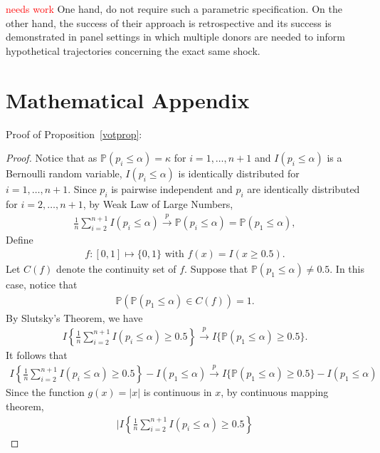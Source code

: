 \documentclass[11pt]{article}
\def\P{\mathbb{P}}
\theoremstyle{definition}
\begin{document}
\textcolor{red}{needs work} One hand, \cite{agarwal2020two} do not require such a parametric specification. On the other hand, the success of their approach is retrospective and its success is demonstrated in panel settings in which multiple donors are needed to inform hypothetical trajectories concerning the exact same shock.





\section{Mathematical Appendix}


Proof of Proposition~\ref{votprop}:

\begin{proof}
Notice that as $\P(p_i \leq \alpha)=\kappa$ for $i = 1, \ldots, n+1$ and $I(p_i \leq  \alpha) $ is a Bernoulli random variable, $I(p_i \leq  \alpha)$ is identically distributed for  $i = 1, \ldots, n+1$. Since $p_i$ is pairwise independent and $p_i$ are identically distributed for $i = 2, \ldots, n+1$, by Weak Law of Large Numbers, 
\begin{align*}
  \frac{1}{n}\sum_{i=2}^{n+1}I(p_i \leq  \alpha)  
   \stackrel{p}{\rightarrow}  \P(p_i \leq \alpha) = \P(p_1 \leq \alpha),
\end{align*}
Define
\begin{align*}
  f \colon [0,1] \mapsto \{0,1\} 
  \text{ with }
  f(x) = I(x \geq 0.5).
\end{align*}
Let $C(f)$ denote the continuity set of $f$. Suppose that $\P(p_1 \leq  \alpha) \neq 0.5$. In this case, notice that 
\begin{align*}
  \P(\P(p_1 \leq  \alpha) \in C(f)) =1.
\end{align*}
By Slutsky's Theorem, we have
\begin{align*}
  I\left\{\frac{1}{n}\sum_{i=2}^{n+1}I(p_i \leq  \alpha) \geq 0.5\right\}
  \stackrel{p}{\rightarrow} 
  I\{ \P(p_1 \leq  \alpha) \geq 0.5\}.
\end{align*}
It follows that
\begin{align*}
   I\left\{\frac{1}{n}\sum_{i=2}^{n+1}I(p_i \leq  \alpha) \geq 0.5\right\}- I( p_1 \leq  \alpha) 
  \stackrel{p}{\rightarrow} 
  I\{ \P(p_1 \leq  \alpha) \geq 0.5\} - I( p_1 \leq  \alpha) 
\end{align*}
Since the function $g(x)= |x|$ is continuous in $x$,  by continuous mapping theorem, 
\begin{align*}
  \bigg|  I\left\{\frac{1}{n}\sum_{i=2}^{n+1}I(p_i \leq  \alpha) \geq 0.5\right\}

\end{align*}
\end{proof}
\end{document}
